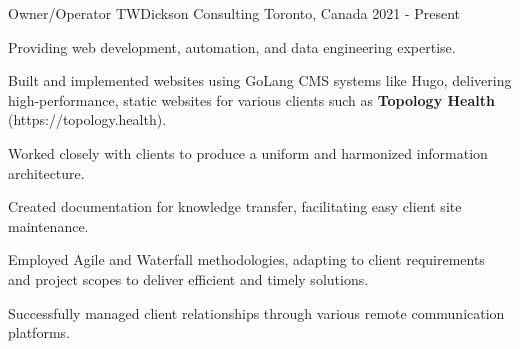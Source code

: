 \begin{cventries}
\cventry
  {Owner/Operator}
  {TWDickson Consulting}
  {Toronto, Canada}
  {2021 - Present}
  {
    \begin{cvitems}
      \item Providing web development, automation, and data engineering expertise.
      \item Built and implemented websites using GoLang CMS systems like Hugo, delivering high-performance, static websites for various clients such as \textbf{Topology Health} (https://topology.health).
      \item Worked closely with clients to produce a uniform and harmonized information architecture.
      \item Created documentation for knowledge transfer, facilitating easy client site maintenance.
      \item Employed Agile and Waterfall methodologies, adapting to client requirements and project scopes to deliver efficient and timely solutions.
      \item Successfully managed client relationships through various remote communication platforms.
    \end{cvitems}
  }
\end{cventries}
